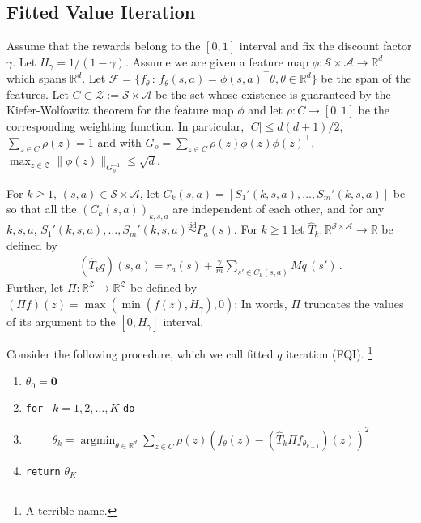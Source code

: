 \documentclass{article}
\newcommand{\norm}[1]{\| #1 \|}
\newcommand{\R}{\mathbb{R}}
\newcommand{\cZ}{\mathcal{Z}}
\DeclareMathOperator*{\argmin}{argmin}
\DeclareMathOperator*{\1}{\mathbbm{1}}
\newcommand{\cF}{\mathcal{F}}
\newcommand{\0}{\mathbf{0}}
\theoremstyle{definition}
\theoremstyle{remark}
\theoremstyle{theorem}
\newcommand{\cS}{\mathcal{S}}
\newcommand{\cA}{\mathcal{A}}
\begin{document}
\subsection*{Fitted Value Iteration}
Assume that the rewards belong to the $[0,1]$ interval and fix the discount factor $\gamma$. Let $H_\gamma = 1/(1-\gamma)$.
Assume we are given a feature map $\phi: \cS \times \cA \to \R^d$ which spans $\R^d$.
Let $\cF = \{ f_\theta \,:\, 
f_\theta(s,a) = \phi(s,a)^\top \theta, \theta \in \R^d \}$ be the span of the features.
Let $C \subset \cZ:=\cS \times \cA$ be the set whose existence is guaranteed by the Kiefer-Wolfowitz theorem for the feature map $\phi$ and let $\rho: C \to [0,1]$ be the corresponding weighting function. In particular, $|C|\le d(d+1)/2$, $\sum_{z\in C} \rho(z)=1$ and with $G_\rho = \sum_{z\in C} \rho(z) \phi(z)\phi(z)^\top$, $\max_{z\in \cZ} \norm{\phi(z)}_{G_\rho^{-1}}\le \sqrt{d}$.

For $k\ge 1$, $(s,a)\in \cS \times \cA$, let $C_k(s,a) = [S_1'(k,s,a),\dots,S_m'(k,s,a)]$ be so that all the $(C_k(s,a))_{k,s,a}$ are independent of each other, and for any $k,s,a$, $S_1'(k,s,a),\dots,S_m'(k,s,a) \stackrel{\textrm{iid}}{\sim} P_a(s)$.
For $k\ge 1$ let $\hat T_k: \R^{\cS\times \cA} \to \R$ be defined by
\begin{align*}
(\hat T_k q)(s,a) = r_a(s) + \frac{\gamma}{m} \sum_{s'\in C_k(s,a)} Mq \, (s')\,.
\end{align*}
Further, let $\Pi: \R^{\cZ} \to \R^{\cZ}$ be defined by $(\Pi f)(z) = \max(\min(f(z),H_\gamma),0)$: In words, $\Pi$ truncates the values of its argument to the $[0,H_\gamma]$ interval.

Consider the following procedure, which we call fitted $q$ iteration (FQI).%
\footnote{A terrible name.}
\begin{enumerate}
\item $\theta_0 = \0$
\item {\tt for } $k=1,2,\dots,K$ {\tt do}
\item $\qquad$ $\theta_k = \argmin_{\theta\in \R^d} \sum_{z\in C} \rho(z) (f_\theta(z)-(\hat T_k \Pi f_{\theta_{k-1}})(z))^2$
\item {\tt return} $\theta_K$
\end{enumerate}
\end{document}
